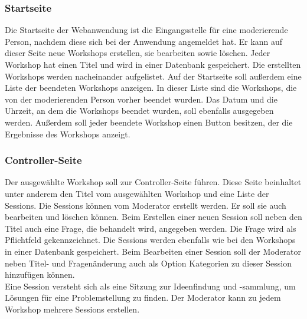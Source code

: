 \subsubsection*{Startseite}
Die Startseite der Webanwendung ist die Eingangsstelle für eine moderierende Person, nachdem diese sich bei der Anwendung angemeldet hat. Er kann auf dieser Seite neue Workshops erstellen, sie bearbeiten sowie löschen. Jeder Workshop hat einen Titel und wird in einer Datenbank gespeichert. Die erstellten Workshops werden nacheinander aufgelistet. Auf der Startseite soll außerdem eine Liste der beendeten Workshops anzeigen. In dieser Liste sind die Workshops, die von der moderierenden Person vorher beendet wurden. Das Datum und die Uhrzeit, an dem die Workshops beendet wurden, soll ebenfalls ausgegeben werden. Außerdem soll jeder beendete Workshop einen Button besitzen, der die Ergebnisse des Workshops anzeigt. 

\subsubsection*{Controller-Seite}
Der ausgewählte Workshop soll zur Controller-Seite führen. Diese Seite beinhaltet unter anderem den Titel vom ausgewählten Workshop und eine Liste der Sessions. Die Sessions können vom Moderator erstellt werden. Er soll sie auch bearbeiten und löschen können. Beim Erstellen einer neuen Session soll neben den Titel auch eine Frage, die behandelt wird, angegeben werden. Die Frage wird als Pflichtfeld gekennzeichnet. Die Sessions werden ebenfalls wie bei den Workshops in einer Datenbank gespeichert. Beim Bearbeiten einer Session soll der Moderator neben Titel- und Fragenänderung auch als Option Kategorien zu dieser Session hinzufügen können.
\\ 

Eine Session versteht sich als eine Sitzung zur Ideenfindung und -sammlung, um Lösungen für eine Problemstellung zu finden. Der Moderator kann zu jedem Workshop mehrere Sessions erstellen.
\\

